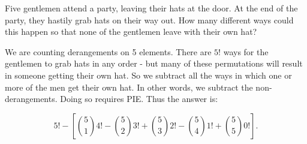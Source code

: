 \documentclass[12pt]{article}
\begin{document}
\begin{example}
  Five gentlemen attend a party, leaving their hats at the door.  At the end of the party, they hastily grab hats on their way out.  How many different ways could this happen so that none of the gentlemen leave with their own hat?

  \begin{solution}
    We are counting derangements on 5 elements.  There are $5!$ ways for the gentlemen to grab hats in any order - but many of these permutations will result in someone getting their own hat.  So we subtract all the ways in which one or more of the men get their own hat.  In other words, we subtract the non-derangements. Doing so requires PIE.  Thus the answer is:

    \[5! - \left[{5 \choose 1}4! - {5 \choose 2}3! + {5 \choose 3}2! - {5 \choose 4}1! + {5 \choose 5}0!\right].\]
  \end{solution}

\end{example}


%
%
\end{document}
